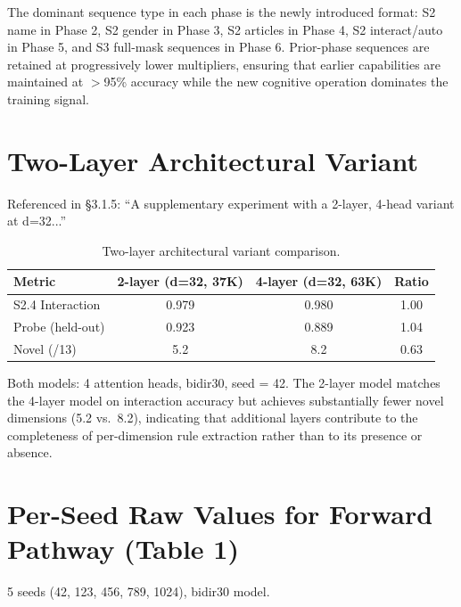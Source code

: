 \documentclass{article}
\begin{document}
The dominant sequence type in each phase is the newly introduced format: S2 name in Phase 2, S2 gender in Phase 3, S2 articles in Phase 4, S2 interact/auto in Phase 5, and S3 full-mask sequences in Phase 6. Prior-phase sequences are retained at progressively lower multipliers, ensuring that earlier capabilities are maintained at $>$95\% accuracy while the new cognitive operation dominates the training signal.

\section{Two-Layer Architectural Variant}

Referenced in \S3.1.5: ``A supplementary experiment with a 2-layer, 4-head variant at d=32...''

\begin{table}[htbp]
\centering
\small
\caption{Two-layer architectural variant comparison.}
\label{tab:twolayer}
\begin{tabular}{lccc}
\toprule
Metric & 2-layer (d=32, 37K) & 4-layer (d=32, 63K) & Ratio \\
\midrule
S2.4 Interaction & 0.979 & 0.980 & 1.00 \\
Probe (held-out) & 0.923 & 0.889 & 1.04 \\
Novel (/13) & 5.2 & 8.2 & 0.63 \\
\bottomrule
\end{tabular}
\end{table}

Both models: 4 attention heads, bidir30, seed = 42. The 2-layer model matches the 4-layer model on interaction accuracy but achieves substantially fewer novel dimensions (5.2 vs.\ 8.2), indicating that additional layers contribute to the completeness of per-dimension rule extraction rather than to its presence or absence.

\section{Per-Seed Raw Values for Forward Pathway (Table 1)}

5 seeds (42, 123, 456, 789, 1024), bidir30 model.
\end{document}
